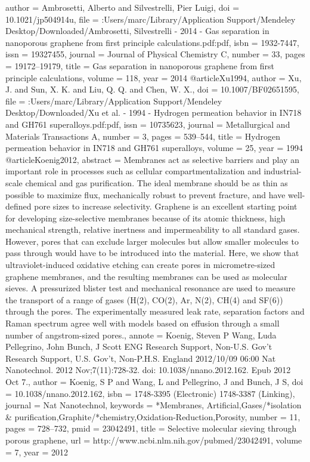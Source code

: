 {author = {Ambrosetti, Alberto and Silvestrelli, Pier Luigi},
doi = {10.1021/jp504914u},
file = {:Users/marc/Library/Application Support/Mendeley Desktop/Downloaded/Ambrosetti, Silvestrelli - 2014 - Gas separation in nanoporous graphene from first principle calculations.pdf:pdf},
isbn = {1932-7447},
issn = {19327455},
journal = {Journal of Physical Chemistry C},
number = {33},
pages = {19172--19179},
title = {{Gas separation in nanoporous graphene from first principle calculations}},
volume = {118},
year = {2014}
}
@article{Xu1994,
author = {Xu, J. and Sun, X. K. and Liu, Q. Q. and Chen, W. X.},
doi = {10.1007/BF02651595},
file = {:Users/marc/Library/Application Support/Mendeley Desktop/Downloaded/Xu et al. - 1994 - Hydrogen permeation behavior in IN718 and GH761 superalloys.pdf:pdf},
issn = {10735623},
journal = {Metallurgical and Materials Transactions A},
number = {3},
pages = {539--544},
title = {{Hydrogen permeation behavior in IN718 and GH761 superalloys}},
volume = {25},
year = {1994}
}
@article{Koenig2012,
abstract = {Membranes act as selective barriers and play an important role in processes such as cellular compartmentalization and industrial-scale chemical and gas purification. The ideal membrane should be as thin as possible to maximize flux, mechanically robust to prevent fracture, and have well-defined pore sizes to increase selectivity. Graphene is an excellent starting point for developing size-selective membranes because of its atomic thickness, high mechanical strength, relative inertness and impermeability to all standard gases. However, pores that can exclude larger molecules but allow smaller molecules to pass through would have to be introduced into the material. Here, we show that ultraviolet-induced oxidative etching can create pores in micrometre-sized graphene membranes, and the resulting membranes can be used as molecular sieves. A pressurized blister test and mechanical resonance are used to measure the transport of a range of gases (H(2), CO(2), Ar, N(2), CH(4) and SF(6)) through the pores. The experimentally measured leak rate, separation factors and Raman spectrum agree well with models based on effusion through a small number of angstrom-sized pores.},
annote = {Koenig, Steven P
Wang, Luda
Pellegrino, John
Bunch, J Scott
ENG
Research Support, Non-U.S. Gov't
Research Support, U.S. Gov't, Non-P.H.S.
England
2012/10/09 06:00
Nat Nanotechnol. 2012 Nov;7(11):728-32. doi: 10.1038/nnano.2012.162. Epub 2012 Oct 7.},
author = {Koenig, S P and Wang, L and Pellegrino, J and Bunch, J S},
doi = {10.1038/nnano.2012.162},
isbn = {1748-3395 (Electronic)
1748-3387 (Linking)},
journal = {Nat Nanotechnol},
keywords = {*Membranes, Artificial,Gases/*isolation {\&} purification,Graphite/*chemistry,Oxidation-Reduction,Porosity},
number = {11},
pages = {728--732},
pmid = {23042491},
title = {{Selective molecular sieving through porous graphene}},
url = {http://www.ncbi.nlm.nih.gov/pubmed/23042491},
volume = {7},
year = {2012}
}
